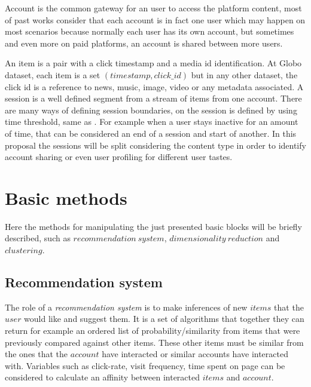 \documentclass[ecp,tc,english]{iiufrgs}
\begin{document}
        Account is the common gateway for an user to access the platform content, most of past works consider that each account is in fact one user which may happen on most scenarios because normally each user has its own account, but sometimes and even more on paid platforms, an account is shared between more users.
    
        An item is a pair with a click timestamp and a media id identification. 
        At Globo dataset, each item is a  set \((timestamp, click\_id)\) but 
        in any other dataset, the click id is a reference to news, music, 
        image, video or any metadata associated. A session is a well defined 
        segment from a stream of items from one account. There are many ways 
        of defining session boundaries, on \cite{10.1145/362883.362920} the session 
        is defined by using time threshold, same as \cite{10.1145/2736277.2741117}. 
        For example when a user stays inactive for an amount of time, that can be 
        considered an end of a session and start of another. In this proposal the 
        sessions will be split considering the content type in order to identify 
        account sharing or even user profiling for different user tastes.

    \section{Basic methods}
    Here the methods for manipulating the just presented basic blocks will be briefly described, such as \(recommendation\ system\), \(dimensionality\ reduction\) and \(clustering\).
    
        \subsection{Recommendation system}
        The role of a \textit{recommendation system} is to make inferences of new \(items\) that the \(user\) would like and suggest them. It is a set of algorithms that together they can return for example an ordered list of probability/similarity from items that were previously compared against other items. These other items must be similar from the ones that the \(account\) have interacted or similar accounts have interacted with.
        Variables such as click-rate, visit frequency, time spent on page can be considered to calculate an affinity between interacted \(items\) and \(account\).
\end{document}
